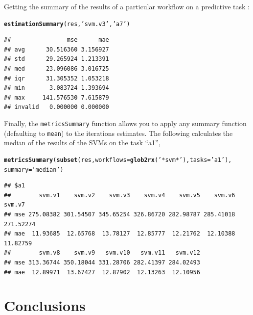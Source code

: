 \documentclass[10pt,a4paper]{article}\usepackage[]{graphicx}\usepackage[]{color}
\makeatletter
\newcommand{\hlstr}[1]{\textcolor[rgb]{0.192,0.494,0.8}{#1}}%
\newcommand{\hlstd}[1]{\textcolor[rgb]{0.345,0.345,0.345}{#1}}%
\newcommand{\hlkwc}[1]{\textcolor[rgb]{0.333,0.667,0.333}{#1}}%
\newcommand{\hlkwd}[1]{\textcolor[rgb]{0.737,0.353,0.396}{\textbf{#1}}}%
\newenvironment{kframe}{%
 \def\at@end@of@kframe{}%
 \ifinner\ifhmode%
  \def\at@end@of@kframe{\end{minipage}}%
  \begin{minipage}{\columnwidth}%
 \fi\fi%
 \def\FrameCommand##1{\hskip\@totalleftmargin \hskip-\fboxsep
 \colorbox{shadecolor}{##1}\hskip-\fboxsep
     \hskip-\linewidth \hskip-\@totalleftmargin \hskip\columnwidth}%
 \MakeFramed {\advance\hsize-\width
   \@totalleftmargin\z@ \linewidth\hsize
   \@setminipage}}%
 {\par\unskip\endMakeFramed%
 \at@end@of@kframe}
\newenvironment{knitrout}{}{} %
\makeatother
\begin{document}
Getting the summary of the results of a particular workflow on a  predictive task :

\begin{knitrout}\footnotesize
{}\color{fgcolor}\begin{kframe}
\begin{alltt}
\hlkwd{estimationSummary}\hlstd{(res,}\hlstr{'svm.v3'}\hlstd{,} \hlstr{'a7'}\hlstd{)}
\end{alltt}
\begin{verbatim}
##                mse      mae
## avg      30.516360 3.156927
## std      29.265924 1.213391
## med      23.096086 3.016725
## iqr      31.305352 1.053218
## min       3.083724 1.393694
## max     141.576530 7.615879
## invalid   0.000000 0.000000
\end{verbatim}
\end{kframe}
\end{knitrout}

Finally, the \texttt{metricsSummary} function allows you to apply any
summary function (defaulting to \texttt{mean}) to the iterations estimates. The following
calculates the median of the results of the SVMs on the task ``a1'',

\begin{knitrout}\small
{}\color{fgcolor}\begin{kframe}
\begin{alltt}
\hlkwd{metricsSummary}\hlstd{(}\hlkwd{subset}\hlstd{(res,} \hlkwc{workflows}\hlstd{=}\hlkwd{glob2rx}\hlstd{(}\hlstr{'*svm*'}\hlstd{),} \hlkwc{tasks}\hlstd{=}\hlstr{'a1'}\hlstd{),}
               \hlkwc{summary}\hlstd{=}\hlstr{'median'}\hlstd{)}
\end{alltt}
\begin{verbatim}
## $a1
##        svm.v1    svm.v2    svm.v3    svm.v4    svm.v5    svm.v6    svm.v7
## mse 275.08382 301.54507 345.65254 326.86720 282.98787 285.41018 271.52274
## mae  11.93685  12.65768  13.78127  12.85777  12.21762  12.10388  11.82759
##        svm.v8    svm.v9   svm.v10   svm.v11   svm.v12
## mse 313.36744 350.18044 331.28706 282.41397 284.02493
## mae  12.89971  13.67427  12.87902  12.13263  12.10956
\end{verbatim}
\end{kframe}
\end{knitrout}

\section{Conclusions}
\end{document}
